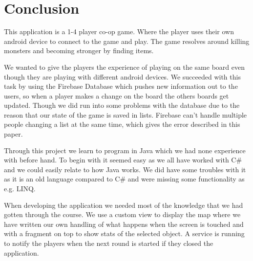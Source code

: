 \pagestyle{Uni}

\chapter{Conclusion}
This application is a 1-4 player co-op game. Where the player uses their own android device to connect to the game and play. The game resolves around killing monsters and becoming stronger by finding items.

We wanted to give the players the experience of playing on the same board even though they are playing with different android devices. We succeeded with this task by using the Firebase Database which pushes new information out to the users, so when a player makes a change on the board the others boards get updated. Though we did run into some problems with the database due to the reason that our state of the game is saved in lists. Firebase can't handle multiple people changing a list at the same time, which gives the error described in this paper.

Through this project we learn to program in Java which we had none experience with before hand. To begin with it seemed easy as we all have worked with C\# and we could easily relate to how Java works. We did have some troubles with it as it is an old language compared to C\# and were missing some functionality as e.g. LINQ.

When developing the application we needed most of the knowledge that we had gotten through the course. We use a custom view to display the map where we have written our own handling of what happens when the screen is touched and with a fragment on top to show stats of the selected object. A service is running to notify the players when the next round is started if they closed the application. 